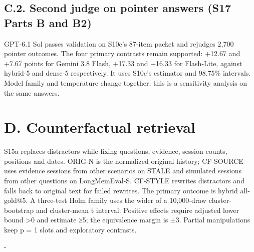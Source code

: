 \documentclass[11pt]{article}
\makeatletter
\newcommand{\KeepTable}[2]{\par\penalty-100\begingroup
  \dimen@ii\pagegoal \advance\dimen@ii-\pagetotal
  \ifdim #1\baselineskip>\dimen@ii
    \ifdim \dimen@ii<0.33\textheight
      \ifdim \dimen@ii>\z@ \vfil\fi \break
    \else
      \ifdim #2\baselineskip>\dimen@ii \ifdim \dimen@ii>\z@ \vfil\fi \break\fi
    \fi
  \fi\endgroup}
\makeatother
\begin{document}
\label{appendix-c4}

\subsection{C.2. Second judge on pointer answers (S17 Parts B and B2)}\label{c.2.-second-judge-on-pointer-answers-s17-parts-b-and-b2}

GPT-6.1 Sol passes validation on S10c's 87-item packet and rejudges 2,700 pointer outcomes. The four primary contrasts remain supported: +12.67 and +7.67 points for Gemini 3.8 Flash, +17.33 and +16.33 for Flash-Lite, against hybrid-5 and dense-5 respectively. It uses S10c's estimator and 98.75\% intervals. Model family and temperature change together; this is a sensitivity analysis on the same answers.

\label{appendix-d}

\section{D. Counterfactual retrieval}\label{d.-counterfactual-retrieval}

S15a replaces distractors while fixing questions, evidence, session counts, positions and dates. ORIG-N is the normalized original history; CF-SOURCE uses evidence sessions from other scenarios on STALE and simulated sessions from other questions on LongMemEval-S. CF-STYLE rewrites distractors and falls back to original text for failed rewrites. The primary outcome is hybrid all-gold@5. A three-test Holm family uses the wider of a 10,000-draw cluster-bootstrap and cluster-mean t interval. Positive effects require adjusted lower bound \textgreater0 and estimate ≥5; the equivalence margin is ±3. Partial manipulations keep p = 1 slots and exploratory contrasts.

\KeepTable{10}{0}

\par\begingroup
\small
\end{document}
